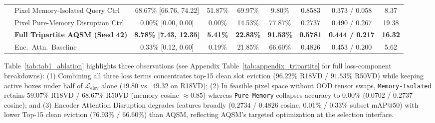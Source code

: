 \documentclass[preprint,10pt]{elsarticle}
\begin{document}
\begin{table}[!htbp]
{{\begin{tabular}{llccccccc}
& Pixel Memory-Isolated Query Ctrl & 68.67\% [66.76, 74.22] & 51.87\% & 69.97\% & 9.80\% & 0.8583 & 0.373 / 0.058 & 8.37 \\
& Pixel Pure-Memory Disruption Ctrl & 0.00\% [0.00, 0.00] & 0.00\% & 14.53\% & 77.87\% & 0.2737 & 0.490 / 0.267 & 19.38 \\
& \textbf{Full Tripartite AQSM (Seed 42)} & \textbf{8.78\% [7.43, 12.35]} & \textbf{5.41\%} & \textbf{22.83\%} & \textbf{91.53\%} & \textbf{0.5781} & \textbf{0.444 / 0.217} & \textbf{16.32} \\
& Enc.\ Attn.\ Baseline \citep{jayasundara2024attention} & 0.33\% [0.12, 0.60] & 0.19\% & 21.85\% & 66.60\% & 0.4826 & 0.453 / 0.200 & 5.62 \\
\bottomrule
\end{tabular}%
}}
\end{table}

Table~\ref{tab:tab1_ablation} highlights three observations (see Appendix Table~\ref{tab:appendix_tripartite} for full loss-component breakdowns): (1) Combining all three loss terms concentrates top-15 clean slot eviction ($96.22\%$ R18VD / $91.53\%$ R50VD) while keeping active boxes under half of $\mathcal{L}_{\mathrm{elev}}$ alone ($19.80$ vs.\ $49.32$ on R18VD); (2) In feasible pixel space without OOD tensor swaps, \texttt{Memory-Isolated} retains $59.07\%$ R18VD / $68.67\%$ R50VD (memory cosine $\approx 0.85$) whereas \texttt{Pure-Memory} collapses accuracy to $0.00\%$ ($0.0702$ / $0.2737$ cosine); and (3) Encoder Attention Disruption \citep{jayasundara2024attention} degrades features broadly ($0.2734$ / $0.4826$ cosine, $0.01\%$ / $0.33\%$ subset mAP@50) with lower Top-15 clean eviction ($76.93\%$ / $66.60\%$) than AQSM, reflecting AQSM's targeted optimization at the selection interface.
\end{document}
